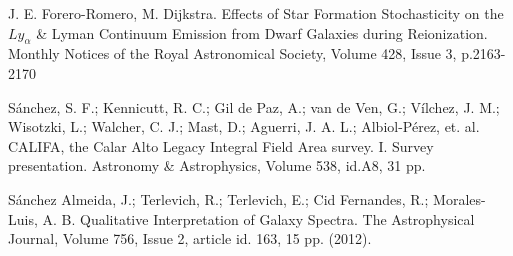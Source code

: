 \documentclass[12pt]{article}
\begin{document}
\begin{thebibliography}{10}

 J. E. Forero-Romero, M. Dijkstra. Effects of Star Formation Stochasticity on the $Ly_{\alpha}$ \&
Lyman Continuum Emission from Dwarf Galaxies during
Reionization. Monthly Notices of the Royal Astronomical Society, Volume 428, Issue 3, p.2163-2170

 S\'anchez, S. F.; Kennicutt, R. C.; Gil de Paz,
A.; van de Ven, G.; V\'ilchez, J. M.; Wisotzki, L.; Walcher, C. J.;
Mast, D.; Aguerri, J. A. L.; Albiol-P\'erez, et. al. CALIFA, the
  Calar Alto Legacy Integral Field Area survey. I. Survey
  presentation. Astronomy \& Astrophysics, Volume 538, id.A8, 31 pp.


 S\'anchez Almeida, J.; Terlevich, R.; Terlevich, E.;
  Cid Fernandes, R.; Morales-Luis, A. B. Qualitative Interpretation of
  Galaxy Spectra. The Astrophysical Journal, Volume 756, Issue 2,
  article id. 163, 15 pp. (2012).



\end{thebibliography}
\end{document}
